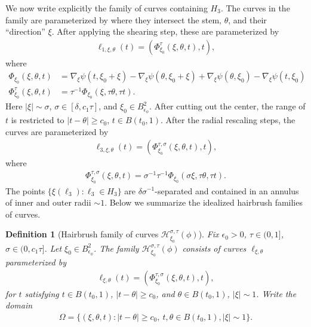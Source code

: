 \documentclass[12pt]{amsart}
\numberwithin{equation}{section}
\newtheorem{definition}[lemma]{Definition}
\newcommand{\1}{\mathbbm{1}}
\newcommand{\Bphi}{B_{\epsilon_\phi}}
\begin{document}
We now write explicitly the family of curves containing $H_3$. The curves in the family are parameterized by where they intersect the stem, $\theta$, and their ``direction'' $\xi$. After applying the shearing step, these are parameterized by
\begin{align}\label{eq: param after sheet}
    \ell_{1, \xi, \theta}(t) = (\Phi_{\xi_0}^\tau(\xi, \theta, t), t), 
\end{align}
where
\begin{align}
    \Phi_{\xi_0}(\xi, \theta, t) &= \nabla_\xi \psi(t, \xi_0 + \xi) - \nabla_\xi\psi(\theta, \xi_0 + \xi) + \nabla_\xi\psi(\theta, \xi_0) - \nabla_\xi\psi(t, \xi_0) \\
    \Phi^\tau_{\xi_0}(\xi, \theta, t) &= \tau^{-1} \Phi_{\xi_0}(\xi, \tau \theta, \tau t).
\end{align}
Here $|\xi| \sim \sigma$, $\sigma \in [\delta, c_1 \tau]$, and $\xi_0 \in \Bphi^2$.
After cutting out the center, the range of $t$ is restricted to $|t - \theta| \geq c_0$, $t \in B(t_0, 1)$. After the radial rescaling steps, the curves are parameterized by 
\begin{align}\label{eq: ugly param curves}
    \ell_{3, \xi, \theta}(t) = (\Phi_{\xi_0}^{\tau,\sigma}(\xi, \theta, t), t),
\end{align}
where 
\begin{align}
    \Phi_{\xi_0}^{\tau, \sigma}(\xi, \theta, t) = \sigma^{-1} \tau^{-1} \Phi_{\xi_0}(\sigma \xi, \tau \theta, \tau t).
\end{align}
The points $\{\xi(\ell_3) : \ell_3 \in H_3\}$ are $\delta \sigma^{-1}$-separated and contained in an annulus of inner and outer radii $\sim 1$. 
Below we summarize the idealized hairbrush families of curves. 
\begin{definition}[Hairbrush family of curves $\mathcal H_{\xi_0}^{\sigma, \tau}(\phi)$]\label{def: hairbrush family}
    Fix $\epsilon_0 > 0$, $\tau \in (0, 1]$, $\sigma \in (0, c_1 \tau]$.
    Let $\xi_0 \in \Bphi^2$. The family $\mathcal H_{\xi_0}^{\sigma, \tau}(\phi)$ consists of curves $\ell_{\xi, \theta}$ parameterized by 
    \begin{align}
        \ell_{\xi, \theta}(t) = (\Phi_{\xi_0}^{\tau, \sigma}(\xi, \theta,t), t), 
    \end{align}
    for $t$ satisfying $t \in B(t_0, 1)$, $|t - \theta| \geq c_0$, and $\theta \in B(t_0, 1)$, $|\xi| \sim 1$. Write the domain 
    \begin{align}
        \Omega = \{(\xi, \theta, t) : |t - \theta| \geq c_0, \ t,\theta \in B(t_0,1), |\xi| \sim 1\}.
    \end{align}
\end{definition}
\end{document}
